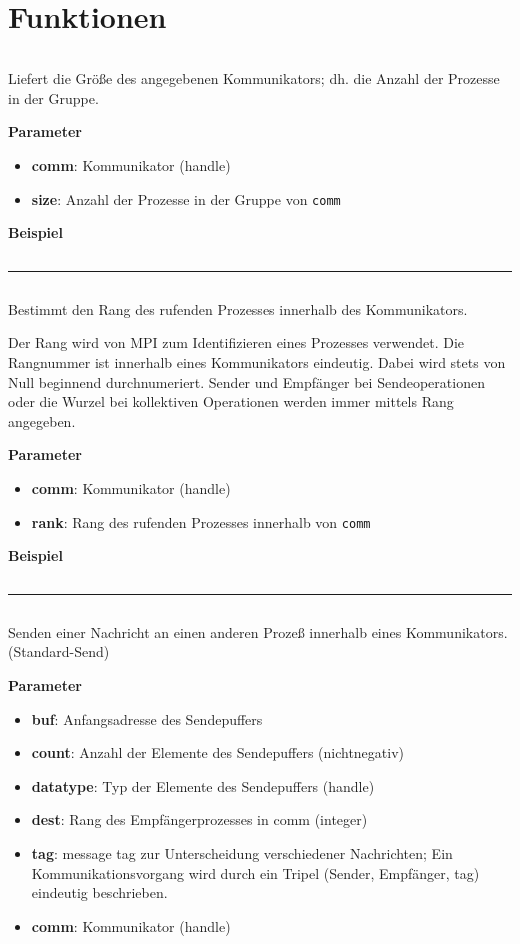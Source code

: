 \section{Funktionen}
\inputminted[numbersep=5pt, tabsize=4]{c}{scripts/mpi/comm-size.c}%
Liefert die Größe des angegebenen Kommunikators; dh. die Anzahl der Prozesse in der Gruppe.

\textbf{Parameter}
\begin{itemize}
    \item \textbf{comm}: Kommunikator (handle)
    \item \textbf{size}: Anzahl der Prozesse in der Gruppe von \texttt{comm}
\end{itemize}

\textbf{Beispiel}
\inputminted[numbersep=5pt, tabsize=4]{c}{scripts/mpi/comm-size-example.c}
\goodbreak
\rule{\textwidth}{0.4pt}%
\inputminted[numbersep=5pt, tabsize=4]{c}{scripts/mpi/comm-rank.c}
Bestimmt den Rang des rufenden Prozesses innerhalb des Kommunikators.

Der Rang wird von MPI zum Identifizieren eines Prozesses verwendet. Die Rangnummer ist innerhalb eines Kommunikators eindeutig. Dabei wird stets von Null beginnend durchnumeriert. Sender und Empfänger bei Sendeoperationen oder die Wurzel bei kollektiven Operationen werden immer mittels Rang angegeben.

\textbf{Parameter}
\begin{itemize}
    \item \textbf{comm}: Kommunikator (handle)
    \item \textbf{rank}: Rang des rufenden Prozesses innerhalb von \texttt{comm}
\end{itemize}

\textbf{Beispiel}
\inputminted[numbersep=5pt, tabsize=4]{c}{scripts/mpi/comm-rank-example.c}
\goodbreak
\rule{\textwidth}{0.4pt}%
\inputminted[numbersep=5pt, tabsize=4]{c}{scripts/mpi/mpi-send.c}
Senden einer Nachricht an einen anderen Prozeß innerhalb eines Kommunikators. (Standard-Send)

\textbf{Parameter}
\begin{itemize}
    \item \textbf{buf}: Anfangsadresse des Sendepuffers 
    \item \textbf{count}: Anzahl der Elemente des Sendepuffers (nichtnegativ) 
    \item \textbf{datatype}: Typ der Elemente des Sendepuffers (handle)
    \item \textbf{dest}: Rang des Empfängerprozesses in comm (integer)
    \item \textbf{tag}: message tag zur Unterscheidung verschiedener Nachrichten; 
Ein Kommunikationsvorgang wird durch ein Tripel (Sender, Empfänger, tag) eindeutig beschrieben. 
    \item \textbf{comm}: Kommunikator (handle)
\end{itemize}

